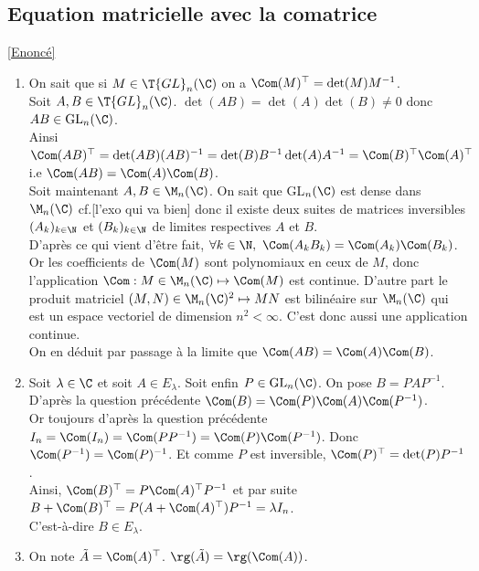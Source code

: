 \documentclass[8pt]{book}
\begin{document}
	\subsection{Equation matricielle avec la comatrice }
	\label{Equation matricielle avec la comatrice corrigé}
	\textcolor{blue}{\hyperref[Equation matricielle avec la comatrice]{[Enoncé]}}\\
	\begin{enumerate}[leftmargin=*]
		\item On sait que si $M\in \T{GL}_n(\C)$ on a $\Com(M)^\top=\det(M)M^{-1}$.\\
		Soit $A,B\in \T{GL}_n(\C)$. $\det(AB)=\det(A)\det(B)\ne 0$ donc $AB\in \text{GL}_n(\C)$.\\
		Ainsi $\Com(AB)^\top=\det(AB)(AB)^{-1}=\det(B)B^{-1}\det(A)A^{-1}=\Com(B)^\top\Com(A)^\top$ i.e $\Com(AB)=\Com(A)\Com(B)$.\\
		Soit maintenant $A,B\in \M_n(\C)$. On sait que GL$_n(\C)$ est dense dans $\M_n(\C)$ cf.[l'exo qui va bien] donc il existe deux suites de matrices inversibles $(A_k)_{k\in \N}$ et $(B_k)_{k\in \N}$ de limites respectives $A$ et $B$.\\
		D'après ce qui vient d'être fait, $\forall k\in \N,\ \Com(A_kB_k)=\Com(A_k)\Com(B_k)$.\\
		Or les coefficients de $\Com(M)$ sont polynomiaux en ceux de $M$, donc l'application $\Com:M\in \M_n(\C)\mapsto \Com(M)$ est continue. D'autre part le produit matriciel $(M,N)\in \M_n(\C)^2\mapsto MN$ est bilinéaire sur $\M_n(\C)$ qui est un espace vectoriel de dimension $n^2<\infty$. C'est donc aussi une application continue.\\
		On en déduit par passage à la limite que $\Com(AB)=\Com(A)\Com(B)$.
		\item Soit $\lambda\in \C$ et soit $A\in E_\lambda$. Soit enfin $P\in \text{GL}_n(\C)$. On pose $B=PAP^{-1}$.\\
		D'après la question précédente $\Com(B)=\Com(P)\Com(A)\Com(P^{-1})$.\\
		Or toujours d'après la question précédente $I_n=\Com(I_n)=\Com(PP^{-1})=\Com(P)\Com(P^{-1})$. Donc $\Com(P^{-1})=\Com(P)^{-1}$. Et comme $P$ est inversible, $\Com(P)^\top=\det(P)P^{-1}$.\\
		Ainsi, $\Com(B)^\top=P\Com(A)^\top P^{-1}$ et par suite $B+\Com(B)^\top=P(A+\Com(A)^\top)P^{-1}=\lambda I_n$.\\
		C'est-à-dire $B\in E_\lambda$.
		\item On note $\tilde A=\Com(A)^\top$. $\rg(\tilde A)=\rg(\Com(A))$.\\

\end{enumerate}
\end{document}
